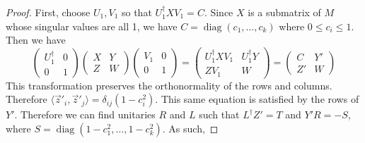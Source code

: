 \documentclass[11pt]{article}
\newcommand{\diag}{\operatorname{diag}}
\begin{document}
\begin{proof}
    First, choose $U_1, V_1$ so that $U_1^\dagger X V_1 = C$. Since $X$ is a submatrix of $M$ whose singular values are all 1, we have $C = \diag(c_1, \dots, c_k)$ where $0 \leq c_i \leq 1$. Then we have
    $$
    \begin{pmatrix}U_1^\dagger & 0 \\ 0 & 1\end{pmatrix}\begin{pmatrix}X & Y \\ Z & W\end{pmatrix} \begin{pmatrix}V_1 & 0 \\ 0 & 1\end{pmatrix} = \begin{pmatrix}U_1^\dagger X V_1 & U_1^\dagger Y \\ ZV_1 & W\end{pmatrix} = \begin{pmatrix}C & Y' \\ Z' & W\end{pmatrix}
    $$
    This transformation preserves the orthonormality of the rows and columns. Therefore $\langle \vec z'_i, \vec z'_j \rangle = \delta_{ij}(1-c_i^2)$. This same equation is satisfied by the rows of $Y'$. Therefore we can find unitaries $R$ and $L$ such that $L^\dagger Z' = T$ and $Y'R = -S$, where $S = \diag(1-c_1^2, \dots, 1-c_k^2)$. As such,


\end{proof}
\end{document}
